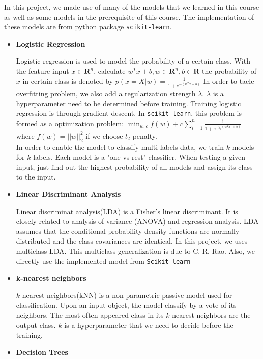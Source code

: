 \documentclass[11.5pt]{article}
\begin{document}
\begin{enumerate}
        In this project, we made use of many of the models that we learned in this course as well as some models in the prerequisite of this course. The implementation of these models are from python package \texttt{scikit-learn}\cite{scikit-learn}.
        \begin{itemize}
            \item \textbf{Logistic Regression}

            Logistic regression is used to model the probability of a certain class. With the feature input $x \in \mathbf{R}^n$, calculate $w^Tx + b, w \in \mathbf{R}^n, b \in \mathbf{R}$ the probability of $x$ in certain class is denoted by
            $p(x = X | w) = \frac{1}{1 + e^{-(w^Tx + b)}}$
            In order to tacle overfitting problem, we also add a regularization strength $\lambda$. $\lambda$ is a hyperparameter need to be determined before training. Training logistic regression is through gradient descent. In \texttt{scikit-learn}\cite{scikit-learn}, this problem is formed as a optimization problem:
            $\min_{w, c} f(w) + c\sum_{i=1}^{n}\frac{1}{1 + e^{-y_i(w^Tx_i + b)}} $
            where $f(w) = ||w||^2_2$ if we choose $l_2$ penalty.\\
            In order to enable the model to classify multi-labels data, we train $k$ models for $k$ labels. Each model is a "one-vs-rest" classifier. When testing a given input, just find out the highest probability of all models and assign its class to the input.
            \item \textbf{Linear Discriminant Analysis}

            Linear discriminat analysis(LDA) is a Fisher's linear discriminant\cite{fisherDA}. It is closely related to analysis of variance (ANOVA) and regression analysis. LDA assumes that the conditional probability density functions are normally distributed and the class covariances are identical. In this project, we uses multiclass LDA. This multiclass generalization is due to C. R. Rao\cite{multiLDA}. Also, we directly use the implemented model from \texttt{Scikit-learn}\cite{scikit-learn}

            \item \textbf{k-nearest neighbors}

            $k$-nearest neighbors(kNN) is a non-parametric passive model used for classification. Upon an input object, the model classify by a vote of its neighbors. The most often appeared class in its $k$ nearest neighbors are the output class. $k$ is a hyperparameter that we need to decide before the training.
            \item \textbf{Decision Trees}


\end{itemize}
\end{enumerate}
\end{document}
